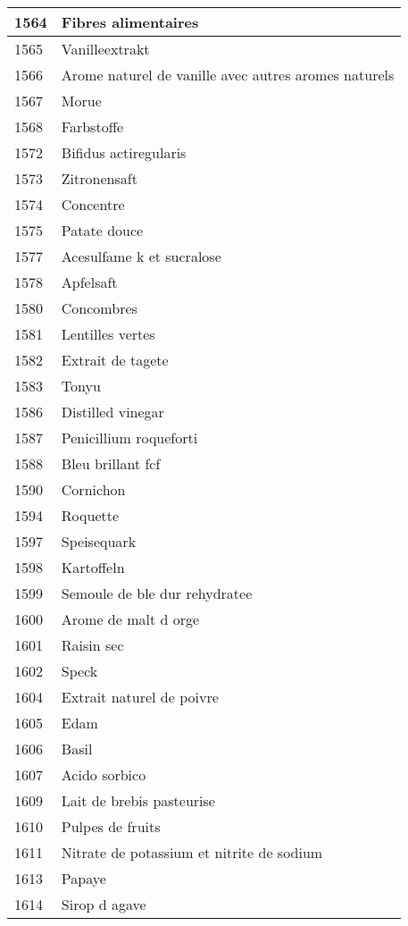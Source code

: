 \begin{longtable}{|l|l|}
1564 & Fibres alimentaires \\ \hline 
1565 & Vanilleextrakt \\ \hline 
1566 & Arome naturel de vanille avec autres aromes naturels \\ \hline 
1567 & Morue \\ \hline 
1568 & Farbstoffe \\ \hline 
1572 & Bifidus actiregularis \\ \hline 
1573 & Zitronensaft \\ \hline 
1574 & Concentre \\ \hline 
1575 & Patate douce \\ \hline 
1577 & Acesulfame k et sucralose \\ \hline 
1578 & Apfelsaft \\ \hline 
1580 & Concombres \\ \hline 
1581 & Lentilles vertes \\ \hline 
1582 & Extrait de tagete \\ \hline 
1583 & Tonyu \\ \hline 
1586 & Distilled vinegar \\ \hline 
1587 & Penicillium roqueforti \\ \hline 
1588 & Bleu brillant fcf \\ \hline 
1590 & Cornichon \\ \hline 
1594 & Roquette \\ \hline 
1597 & Speisequark \\ \hline 
1598 & Kartoffeln \\ \hline 
1599 & Semoule de ble dur rehydratee \\ \hline 
1600 & Arome de malt d orge \\ \hline 
1601 & Raisin sec \\ \hline 
1602 & Speck \\ \hline 
1604 & Extrait naturel de poivre \\ \hline 
1605 & Edam \\ \hline 
1606 & Basil \\ \hline 
1607 & Acido sorbico \\ \hline 
1609 & Lait de brebis pasteurise \\ \hline 
1610 & Pulpes de fruits \\ \hline 
1611 & Nitrate de potassium et nitrite de sodium \\ \hline 
1613 & Papaye \\ \hline 
1614 & Sirop d agave \\ \hline 

\end{longtable}
